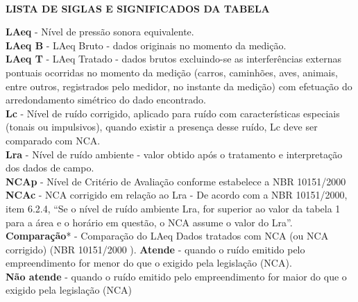\newpage
\renewcommand{\contentsname}{{\large \textbf{ÍNDICE}}}
\tableofcontents*

\

\textbf{LISTA DE SIGLAS E SIGNIFICADOS DA TABELA} \\

{\noindent
	\textbf{LAeq} - Nível de pressão sonora equivalente. \\
	\textbf{LAeq B} - LAeq Bruto - dados originais no momento da medição. \\
	\textbf{LAeq T} - LAeq Tratado - dados brutos excluindo-se as interferências externas pontuais ocorridas no momento da medição (carros, caminhões, aves, animais, entre outros, registrados pelo medidor, no instante da medição) com  efetuação do arredondamento simétrico do dado encontrado. \\
	\textbf{Lc} - Nível de ruído corrigido, aplicado para ruído com características especiais (tonais ou impulsivos), quando existir a presença desse ruído, Lc deve ser comparado com NCA. \\
	\textbf{Lra} - Nível de ruído ambiente - valor obtido após o tratamento e interpretação dos dados de campo. \\
	\textbf{NCAp} - Nível de Critério de Avaliação conforme estabelece a NBR 10151/2000
	\textbf{NCAc} - NCA corrigido em relação ao Lra - De acordo com a NBR 10151/2000, item 6.2.4, “Se o nível de ruído ambiente Lra, for superior ao valor da tabela 1 para a área e o horário em questão, o NCA assume o valor do Lra”. \\
	\textbf{Comparação}* - Comparação do LAeq Dados tratados com NCA (ou NCA corrigido) (NBR 10151/2000 ).
	\textbf{Atende} - quando o ruído emitido pelo empreendimento for menor do que o exigido pela legislação (NCA). \\
	\textbf{Não atende} - quando o ruído emitido pelo empreendimento for maior do que o exigido pela legislação (NCA) \\}